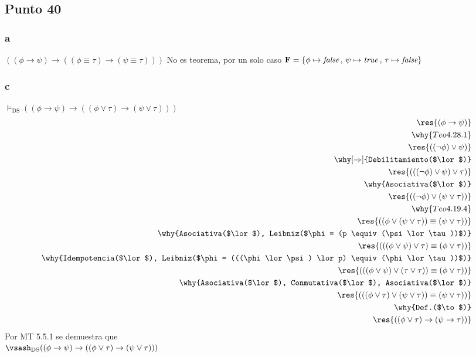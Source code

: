\documentclass{article}
\begin{document}
\subsection{Punto 40}
\subsubsection{a}
\begin{logicenv}[5]{$((\phi \to \psi) \to ((\phi \equiv \tau) \to (\psi \equiv \tau)))$}
    No es teorema, por un solo caso $\mathbf{F} = \{\phi \mapsto \textit{false}\,,\,\psi \mapsto \textrm{\textit{true}}\,,\,\tau \mapsto \textit{false}\}$
\end{logicenv}
\subsubsection{c}
\label{P40-c}
\begin{logicenv}[5]{$\vDash_\text{DS} ((\phi \to \psi) \to ((\phi \lor \tau) \to (\psi \lor \tau)))$}
    \begin{align*}
            \res{(\phi \to \psi)}\\
        \why{Teo 4.28.1}\\
            \res{((\neg \phi) \lor \psi)}\\
        \why[\Rightarrow]{Debilitamiento($\lor$)}\\
            \res{(((\neg \phi) \lor \psi) \lor \tau)}\\
        \why{Asociativa($\lor$)}\\
            \res{((\neg \phi) \lor (\psi \lor \tau))}\\
        \why{Teo 4.19.4}\\
            \res{((\phi \lor (\psi \lor \tau)) \equiv (\psi \lor \tau))}\\
        \why{Asociativa($\lor$), Leibniz($\phi = (p \equiv (\psi \lor \tau))$)}\\
            \res{(((\phi \lor \psi) \lor \tau) \equiv (\phi \lor \tau))}\\
        \why{Idempotencia($\lor$), Leibniz($\phi = (((\phi \lor \psi) \lor p) \equiv (\phi \lor \tau))$)}\\
            \res{(((\phi \lor \psi) \lor (\tau \lor \tau)) \equiv (\phi \lor \tau))}\\
        \why{Asociativa($\lor$), Conmutativa($\lor$), Asociativa($\lor$)}\\
            \res{(((\phi \lor \tau) \lor (\psi \lor \tau)) \equiv (\psi \lor \tau))}\\
        \why{Def.($\to$)}\\
            \res{((\phi \lor \tau) \to (\psi \to \tau))}
    \end{align*}
    Por MT 5.5.1 se demuestra que\\
    $\vsash_\text{DS} ((\phi \to \psi) \to ((\phi \lor \tau) \to (\psi \lor \tau)))$
\end{logicenv}
\end{document}
